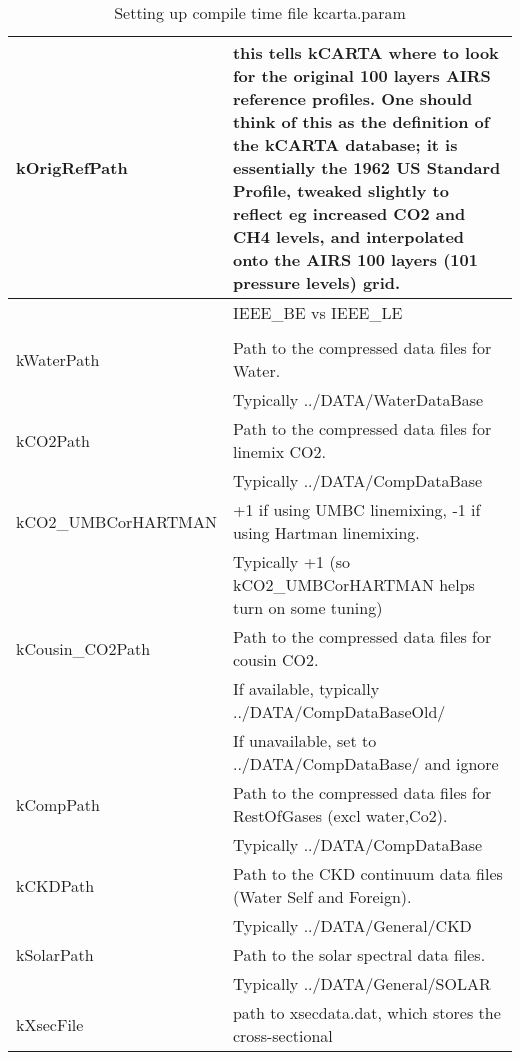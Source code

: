 \documentclass[12pt]{article}
\newlength{\colwidth}
\begin{document}
\begin{longtable}{|l|p{\colwidth}|}
\caption{Setting up compile time file {\sf kcarta.param}\label{kcarta.param}}\\
\hline
kOrigRefPath & this tells kCARTA where to look for the original 100 layers
              AIRS reference profiles. One should think of this as the
              definition of the kCARTA database; it is essentially the 
              1962 US Standard Profile, tweaked slightly to reflect eg 
              increased CO2 and CH4 levels, and interpolated onto the AIRS
              100 layers (101 pressure levels) grid.\\
              \hline \hline
           & IEEE\_BE vs IEEE\_LE\\              
           & \\
kWaterPath & Path to the compressed data files for Water.\\ 
           & Typically {\sf ../DATA/WaterDataBase}\\ 
kCO2Path   & Path to the compressed data files for linemix CO2.\\
           & Typically {\sf ../DATA/CompDataBase}\\ 
kCO2\_UMBCorHARTMAN  & +1 if using UMBC linemixing, -1 if using Hartman linemixing.\\
           & Typically +1 (so kCO2\_UMBCorHARTMAN helps turn on some tuning)\\
kCousin\_CO2Path   & Path to the compressed data files for cousin CO2.\\
           & If available, typically {\sf ../DATA/CompDataBaseOld/}\\ 
           & If unavailable, set to {\sf ../DATA/CompDataBase/} and ignore\\ 
kCompPath  & Path to the compressed data files for RestOfGases 
             (excl water,Co2).\\
           & Typically {\sf ../DATA/CompDataBase}\\ 
kCKDPath   & Path to the CKD continuum data files (Water Self and Foreign).\\ 
           & Typically {\sf ../DATA/General/CKD}\\ 
kSolarPath & Path to the solar spectral data files.\\
           & Typically {\sf ../DATA/General/SOLAR}\\ 
kXsecFile & path to {\sf xsecdata.dat}, which stores the cross-sectional 

\end{longtable}
\end{document}
